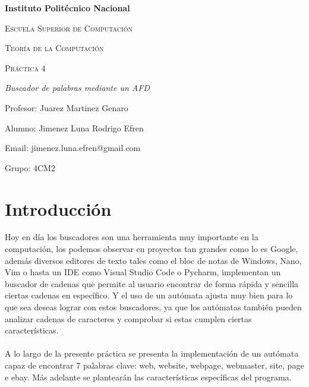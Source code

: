 \documentclass{article}
\begin{document}
	\begin{titlepage}
		\centering
		
		{\bfseries\LARGE Instituto Polit\'ecnico Nacional \par}
		\vspace{1cm}
		{\scshape\Large Escuela Superior de Computaci\'on \par}
		\vspace{2cm}
		{\scshape\Large Teor\'ia de la Computaci\'on \par}
		\vspace{2cm}
		{\scshape\Large Pr\'actica 4 \par}
		\vspace{0.5cm}
		{\itshape\Large Buscador de palabras mediante un AFD \par}
		\vspace{2cm}
		{\Large Profesor: Juarez Martinez Genaro\par}
		\vspace{.8cm}
		{\Large Alumno: Jimenez Luna Rodrigo Efren \par}
		\vspace{.8cm}
		{\Large Email: jimenez.luna.efren@gmail.com \par}
		\vspace{.8cm}
		{\Large Grupo: 4CM2\par}
		\vfill
	\end{titlepage}
	
	\tableofcontents
	
	\newpage
	
	\section{Introducción}
	
	Hoy en día los buscadores son una herramienta muy importante en la computación, los podemos observar en proyectos tan grandes como lo es Google, además diversos editores de texto tales como el bloc de notas de Windows, Nano, Vim o hasta un IDE como Visual Studio Code o Pycharm, implementan un buscador de cadenas que permite al usuario encontrar de forma rápida y sencilla ciertas cadenas en específico. Y el uso de un autómata ajusta muy bien para lo que sea deseas lograr con estos buscadores, ya que los autómatas también pueden analizar cadenas de caracteres y comprobar si estas cumplen ciertas características.
	\\\\A lo largo de la presente práctica se presenta la implementación de un autómata capaz de encontrar 7 palabras clave: web, website, webpage, webmaster, site, page e ebay. Más adelante se plantearán las características específicas del programa.
	
\end{document}
